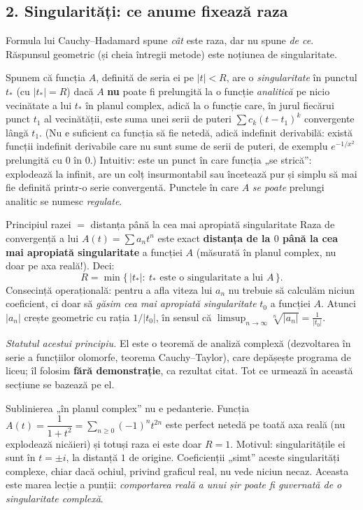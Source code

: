 \subsection*{2. Singularități: ce anume fixează raza}

Formula lui Cauchy--Hadamard spune \emph{cât} este raza, dar nu spune \emph{de ce}. Răspunsul geometric (și cheia întregii metode) este noțiunea de singularitate.

\begin{definitie}[Singularitate]
Spunem că funcția $A$, definită de seria ei pe $|t|<R$, are o \emph{singularitate} în punctul $t_*$ (cu $|t_*|=R$) dacă $A$ \textbf{nu} poate fi prelungită la o funcție \emph{analitică} pe nicio vecinătate a lui $t_*$ în planul complex, adică la o funcție care, în jurul fiecărui punct $t_1$ al vecinătății, este suma unei serii de puteri $\sum c_k(t-t_1)^k$ convergente lângă $t_1$. (Nu e suficient ca funcția să fie netedă, adică indefinit derivabilă: există funcții indefinit derivabile care nu sunt sume de serii de puteri, de exemplu $e^{-1/x^2}$ prelungită cu $0$ în $0$.) Intuitiv: este un punct în care funcția „se strică'': explodează la infinit, are un colț insurmontabil sau încetează pur și simplu să mai fie definită printr-o serie convergentă. Punctele în care $A$ \emph{se poate} prelungi analitic se numesc \emph{regulate}.
\end{definitie}

\begin{tehbox}{Principiul razei $=$ distanța până la cea mai apropiată singularitate}
Raza de convergență a lui $A(t)=\sum a_nt^n$ este exact \textbf{distanța de la $0$ până la cea mai apropiată singularitate} a funcției $A$ (măsurată în planul complex, nu doar pe axa reală!). Deci:
\[
R=\min\{\,|t_*|:\ t_*\text{ este o singularitate a lui }A\,\}.
\]
Consecință operațională: pentru a afla viteza lui $a_n$ nu trebuie să calculăm niciun coeficient, ci doar să \emph{găsim cea mai apropiată singularitate} $t_0$ a funcției $A$. Atunci $|a_n|$ crește geometric cu rația $1/|t_0|$, în sensul că $\limsup_{n\to\infty}\sqrt[n]{|a_n|}=\frac{1}{|t_0|}$.

\smallskip
\emph{Statutul acestui principiu.} El este o teoremă de analiză complexă (dezvoltarea în serie a funcțiilor olomorfe, teorema Cauchy--Taylor), care depășește programa de liceu; îl folosim \textbf{fără demonstrație}, ca rezultat citat. Tot ce urmează în această secțiune se bazează pe el.
\end{tehbox}

\begin{obs}
Sublinierea „în planul complex'' nu e pedanterie. Funcția $A(t)=\dfrac{1}{1+t^2}=\sum_{n\ge0}(-1)^nt^{2n}$ este perfect netedă pe toată axa reală (nu explodează nicăieri) și totuși raza ei este doar $R=1$. Motivul: singularitățile ei sunt în $t=\pm i$, la distanță $1$ de origine. Coeficienții „simt'' aceste singularități complexe, chiar dacă ochiul, privind graficul real, nu vede niciun necaz. Aceasta este marea lecție a punții: \emph{comportarea reală a unui șir poate fi guvernată de o singularitate complexă}.
\end{obs}

